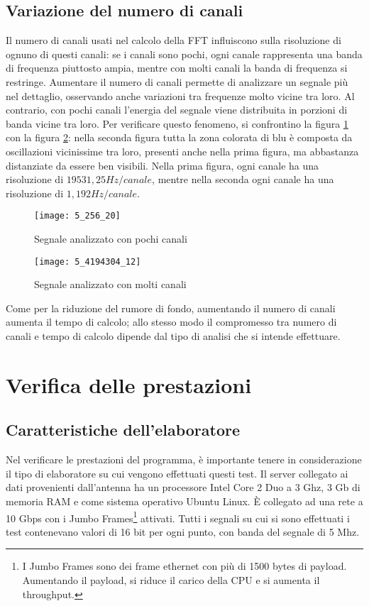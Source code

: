 \subsection{Variazione del numero di canali}
Il numero di canali usati nel calcolo della \ac{FFT} influiscono sulla
risoluzione di ognuno di questi canali: se i canali sono pochi, ogni canale
rappresenta una banda di frequenza piuttosto ampia, mentre con molti canali la
banda di frequenza si restringe. Aumentare il numero di canali permette di
analizzare un segnale pi\`u nel dettaglio, osservando anche variazioni tra
frequenze molto vicine tra loro. Al contrario, con pochi canali l'energia del
segnale viene distribuita in porzioni di banda vicine tra loro. Per verificare
questo fenomeno, si confrontino la figura \ref{fig:low_chans} con la figura
\ref{fig:high_chans}: nella seconda figura tutta la zona colorata di blu \`e
composta da oscillazioni vicinissime tra loro, presenti anche nella prima
figura, ma abbastanza distanziate da essere ben visibili. Nella prima figura,
ogni canale ha una risoluzione di $19531,25 Hz/canale$, mentre nella seconda
ogni canale ha una risoluzione di $1,192 Hz/canale$.
\begin{figure}[htb]
	\begin{center}
		\texttt{[image: 5\_256\_20]}
	\end{center}
	\caption{Segnale analizzato con pochi canali}
	\label{fig:low_chans}
\end{figure}

\begin{figure}[htb]
	\begin{center}
		\texttt{[image: 5\_4194304\_12]}
	\end{center}
	\caption{Segnale analizzato con molti canali}
	\label{fig:high_chans}
\end{figure}

Come per la riduzione del rumore di fondo, aumentando il numero di canali
aumenta il tempo di calcolo; allo stesso modo il compromesso tra numero di
canali e tempo di calcolo dipende dal tipo di analisi che si intende effettuare.

\section{Verifica delle prestazioni}
\subsection{Caratteristiche dell'elaboratore}
Nel verificare le prestazioni del programma, \`e importante tenere in
considerazione il tipo di elaboratore su cui vengono effettuati questi test. Il
server collegato ai dati provenienti dall'antenna ha un processore Intel Core 2
Duo a 3 Ghz, 3 Gb di memoria RAM e come sistema operativo Ubuntu Linux. \`E
collegato ad una rete a 10 Gbps con i Jumbo Frames\footnote{I Jumbo Frames sono
    dei frame ethernet con pi\`u di 1500 bytes di payload. Aumentando il
    payload, si riduce il carico della CPU e si aumenta il throughput.}
attivati.  Tutti i segnali su cui si sono effettuati i test contenevano valori
di 16 bit per ogni punto, con banda del segnale di 5 Mhz.
